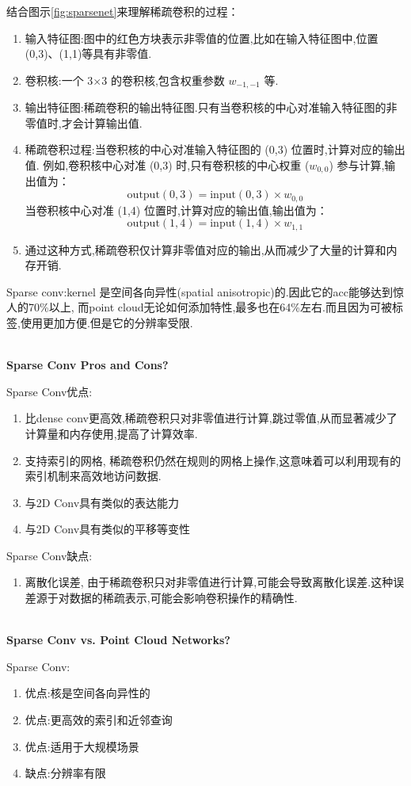 结合图示\ref{fig:sparsenet}来理解稀疏卷积的过程：

\begin{enumerate}
\item 输入特征图:图中的红色方块表示非零值的位置,比如在输入特征图中,位置 (0,3)、(1,1)等具有非零值.
\item 卷积核:一个 3$\times$3 的卷积核,包含权重参数 $w_{-1,-1}$ 等.
\item 输出特征图:稀疏卷积的输出特征图.只有当卷积核的中心对准输入特征图的非零值时,才会计算输出值.
\item 稀疏卷积过程:当卷积核的中心对准输入特征图的 (0,3) 位置时,计算对应的输出值.
例如,卷积核中心对准 (0,3) 时,只有卷积核的中心权重 ($w_{0,0}$) 参与计算,输出值为：\[ \text{output}(0,3) = \text{input}(0,3) \times w_{0,0} \]
当卷积核中心对准 (1,4) 位置时,计算对应的输出值,输出值为：\[ \text{output}(1,4) = \text{input}(1,4) \times w_{1,1} \]
\item 通过这种方式,稀疏卷积仅计算非零值对应的输出,从而减少了大量的计算和内存开销.
\end{enumerate}

Sparse conv:kernel 是空间各向异性(spatial anisotropic)的.因此它的acc能够达到惊人的70\%以上,
而point cloud无论如何添加特性,最多也在64\%左右.而且因为可被标签,使用更加方便.但是它的分辨率受限.

\textbf{\\Sparse Conv Pros and Cons?}

Sparse Conv优点:
\begin{enumerate}
    \item 比dense conv更高效,稀疏卷积只对非零值进行计算,跳过零值,从而显著减少了计算量和内存使用,提高了计算效率.
    \item 支持索引的网格, 稀疏卷积仍然在规则的网格上操作,这意味着可以利用现有的索引机制来高效地访问数据.
    \item 与2D Conv具有类似的表达能力
    \item 与2D Conv具有类似的平移等变性
\end{enumerate}

Sparse Conv缺点:
\begin{enumerate}
    \item 离散化误差, 由于稀疏卷积只对非零值进行计算,可能会导致离散化误差.这种误差源于对数据的稀疏表示,可能会影响卷积操作的精确性.
\end{enumerate}

\textbf{\\Sparse Conv vs. Point Cloud Networks?}

Sparse Conv:
\begin{enumerate}
    \item 优点:核是空间各向异性的
    \item 优点:更高效的索引和近邻查询
    \item 优点:适用于大规模场景
    \item 缺点:分辨率有限
\end{enumerate}

